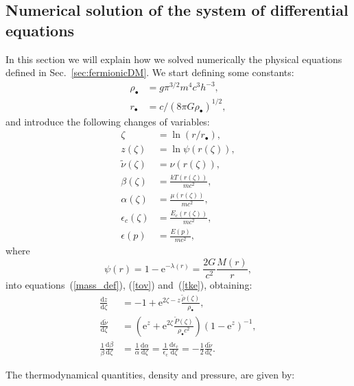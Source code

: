 \documentclass[twocolumn]{aa}
\begin{document}
\begin{appendix}
\section{Numerical solution of the system of differential equations}
\label{app:numerical}
In this section we will explain how we solved numerically the physical equations defined in Sec.~\ref{sec:fermionicDM}.
We start defining some constants:
\begin{align}
    \rho_{\bullet}&= g\pi^{3/2} m^4 c^3 h^{-3},\\
    r_\bullet &= c/(8\pi G \rho_\bullet)^{1/2},
\end{align}
and introduce the following changes of variables:
\begin{align}
   \zeta &= \ln(r/r_\bullet),\\
   z(\zeta) &=\ln\psi(r(\zeta)),\\
   \tilde{\nu}(\zeta) &=\nu(r(\zeta)),\\
   \beta(\zeta)&=\frac{kT(r(\zeta))}{mc^2},\\
   \alpha(\zeta)&=\frac{\mu(r(\zeta))}{mc^2},\\
   \epsilon_c(\zeta)&=\frac{E_c(r(\zeta))}{mc^2},\\
   \epsilon(p)&=\frac{E(p)}{mc^2},
\end{align}
where
\begin{equation}
    \psi(r) = 1-\textrm{e}^{-\lambda(r)} = \frac{2G}{c^2}\frac{M(r)}{r},
    \label{mass_dm}
\end{equation}
into equations~(\ref{mass_def}), (\ref{tov}) and~(\ref{tke}), obtaining:
\begin{align}
   \label{sode}
   \frac{\mathrm{d}z}{\mathrm{d}\zeta} & = -1+\mathrm{e}^{2\zeta-z}\frac{\tilde{\rho}(\zeta)}{\rho_{\bullet}},\\
   \label{sode2}
   \frac{\mathrm{d}\tilde{\nu}}{\mathrm{d}\zeta} & = \left(\mathrm{e}^{z}+\mathrm{e}^{2\zeta}\frac{\tilde{P}(\zeta)}{\rho_{\bullet}c^2}\right)(1-\mathrm{e}^{z})^{-1},\\
   \frac{1}{\beta}\frac{\mathrm{d}\beta}{\mathrm{d}\zeta}&=\frac{1}{\alpha}\frac{\mathrm{d}\alpha}{\mathrm{d}\zeta}=
   \frac{1}{\epsilon_\mathrm{c}}\frac{\mathrm{d} \epsilon_\mathrm{c}}{\mathrm{d}\zeta}=-\frac{1}{2}\frac{\mathrm{d}\tilde{\nu}}{\mathrm{d}\zeta}.\label{tke2}
\end{align}


The thermodynamical quantities, density and pressure, are given by:


\end{appendix}
\end{document}

